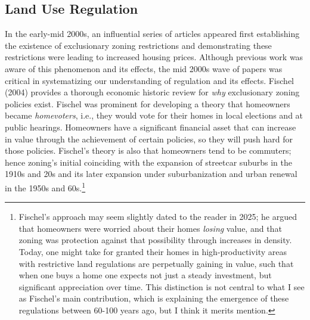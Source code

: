 \documentclass{article}[11pt]
\begin{document}
	\subsection{Land Use Regulation}
In the early-mid 2000s, an influential series of articles appeared first establishing the existence of exclusionary zoning restrictions and demonstrating these restrictions were leading to increased housing prices. Although previous work was aware of this phenomenon and its effects, the mid 2000s wave of papers was critical in systematizing our understanding of regulation and its effects. Fischel (2004) provides a thorough economic historic review for \textit{why} exclusionary zoning policies exist. \citep{fischel2004economic} Fischel was prominent for developing a theory that homeowners became \textit{homevoters}, i.e., they would vote for their homes in local elections and at public hearings. Homeowners have a significant financial asset that can increase in value through the achievement of certain policies, so they will push hard for those policies. Fischel's theory is also that homeowners tend to be commuters; hence zoning's initial coinciding with the expansion of streetcar suburbs in the 1910s and 20s and its later expansion under suburbanization and urban renewal in the 1950s and 60s.\footnote{Fischel's approach may seem slightly dated to the reader in 2025; he argued that homeowners were worried about their homes \textit{losing} value, and that zoning was protection against that possibility through increases in density. Today, one might take for granted their homes in high-productivity areas with restrictive land regulations are perpetually gaining in value, such that when one buys a home one expects not just a steady investment, but significant appreciation over time. This distinction is not central to what I see as Fischel's main contribution, which is explaining the emergence of these regulations between 60-100 years ago, but I think it merits mention.} 
\end{document}
